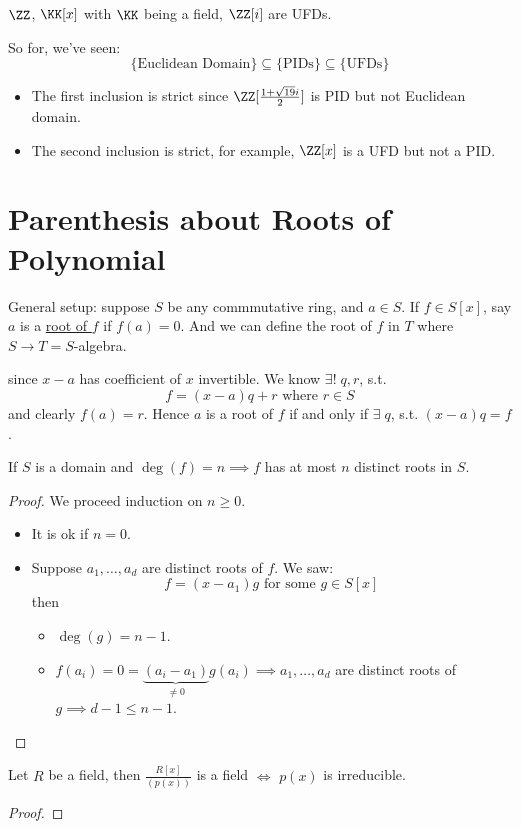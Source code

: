 \begin{corollary}
	\( \ZZ \), \( \KK[x] \) with \( \KK \) being a field, \( \ZZ[i] \) are UFDs.
\end{corollary}

So for, we've seen:
\[
	\{\text{Euclidean Domain}\} \subseteq \{\text{PIDs}\} \subseteq \{\text{UFDs}\}
\]
\begin{itemize}
	\item The first inclusion is strict since \( \ZZ[\frac{1+\sqrt{19}i}{2}] \) is PID but not
	      Euclidean domain.
	\item The second inclusion is strict, for example, \( \ZZ[x] \) is a UFD but not a PID.
\end{itemize}

\section{Parenthesis about Roots of Polynomial}
General setup: suppose \( S \) be any commmutative ring, and \( a\in S \). If \( f \in S[x] \), say
\( a \) is a \underline{root of $f$} if \( f(a) = 0 \). And we can define the root of \( f \) in \(
T\) where \( S \to T = S \)-algebra.

\begin{note}
	since \( x-a \) has coefficient of \( x \) invertible. We know \( \exists ! \; q,r \), s.t.
	\[
		f = (x-a)q + r \text{ where } r \in S
	\]
	and clearly \( f(a) = r \). Hence \( a \) is a root of \( f \) if and only if \( \exists \; q \),
	s.t. \( (x-a)q = f \).
\end{note}

\begin{proposition}
	If \( S \) is a domain and \( \deg(f) = n \implies f \) has at most \( n \) distinct roots in \( S \).
\end{proposition}

\begin{proof}
	We proceed induction on \( n\geq 0 \).
	\begin{itemize}
		\item It is ok if \( n=0 \).
		\item Suppose \( a_1,\ldots, a_d \) are distinct roots of \( f \). We saw:
		      \[
			      f = (x-a_1) g \text{ for some } g \in S[x]
		      \]
		      then
		      \begin{itemize}
			      \item \( \deg(g) = n-1 \).
			      \item \( f(a_i) = 0 = \underbrace{(a_i - a_1)}_{\ne 0} g(a_i) \implies a_1,\ldots, a_d \)
			            are distinct roots of \( g \implies d-1 \leq n-1 \).
		      \end{itemize}
	\end{itemize}
\end{proof}

\begin{theorem}
	Let \( R \) be a field, then \( \frac{R[x]}{(p(x))} \) is a field \( \iff \) \( p(x) \) is irreducible.
\end{theorem}

\begin{proof}
\end{proof}

